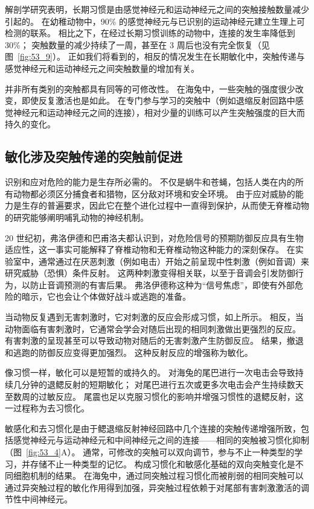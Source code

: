 解剖学研究表明，长期习惯是由感觉神经元和运动神经元之间的突触接触数量减少引起的。
在幼稚动物中，90\% 的感觉神经元与已识别的运动神经元建立生理上可检测的联系。
相比之下，在经过长期习惯训练的动物中，连接的发生率降低到 30\%；
突触数量的减少持续了一周，甚至在 3 周后也没有完全恢复（见图~\ref{fig:53_9}）。
正如我们将看到的，相反的情况发生在长期敏化中，突触传递与感觉神经元和运动神经元之间突触数量的增加有关。


并非所有类别的突触都具有同等的可修改性。
在海兔中，一些突触的强度很少改变，即使反复激活也是如此。
在专门参与学习的突触中（例如退缩反射回路中感觉神经元和运动神经元之间的连接），相对少量的训练可以产生突触强度的巨大而持久的变化。



\subsection{敏化涉及突触传递的突触前促进}

识别和应对危险的能力是生存所必需的。
不仅是蜗牛和苍蝇，包括人类在内的所有动物都必须区分捕食者和猎物，区分敌对环境和安全环境。
由于应对威胁的能力是生存的普遍要求，因此它在整个进化过程中一直得到保护，从而使无脊椎动物的研究能够阐明哺乳动物的神经机制。


20 世纪初，弗洛伊德和巴甫洛夫都认识到，对危险信号的预期防御反应具有生物适应性，这一事实可能解释了脊椎动物和无脊椎动物这种能力的深刻保存。
在实验室中，通常通过在厌恶刺激（例如电击）开始之前呈现中性刺激（例如音调）来研究威胁（恐惧）条件反射。
这两种刺激变得相关联，以至于音调会引发防御行为，以防止音调预测的有害后果。
弗洛伊德称这种为“信号焦虑”，即使有外部危险的暗示，它也会让个体做好战斗或逃跑的准备。


当动物反复遇到无害刺激时，它对刺激的反应会形成习惯，如上所示。
相反，当动物面临有害刺激时，它通常会学会对随后出现的相同刺激做出更强烈的反应。
有害刺激的呈现甚至可以导致动物对随后的无害刺激产生防御反应。
结果，撤退和逃跑的防御反应变得更加强烈。
这种反射反应的增强称为敏化。


像习惯一样，敏化可以是短暂的或持久的。
对海兔的尾巴进行一次电击会导致持续几分钟的退鳃反射的短期敏化；
对尾巴进行五次或更多次电击会产生持续数天至数周的过敏反应。
尾震也足以克服习惯化的影响并增强习惯性的退鳃反射，这一过程称为去习惯化。


敏感化和去习惯化是由于鳃退缩反射神经回路中几个连接的突触传递增强所致，包括感觉神经元与运动神经元和中间神经元之间的连接——相同的突触被习惯化抑制（图~\ref{fig:53_4}A）。
通常，可修改的突触可以双向调节，参与不止一种类型的学习，并存储不止一种类型的记忆。
构成习惯化和敏感化基础的双向突触变化是不同细胞机制的结果。
在海兔中，通过同突触过程习惯化而被削弱的相同突触可以通过异突触过程的敏化作用得到加强，异突触过程依赖于对尾部有害刺激激活的调节性中间神经元。


